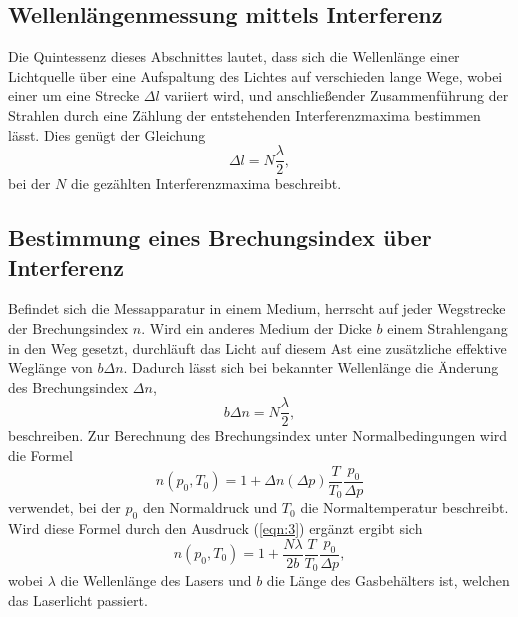 \subsection{Wellenlängenmessung mittels Interferenz}

Die Quintessenz dieses Abschnittes lautet, dass sich die Wellenlänge einer Lichtquelle über eine Aufspaltung des Lichtes auf verschieden lange Wege, wobei einer um eine Strecke $\Delta l$ variiert wird, und anschließender Zusammenführung der Strahlen durch eine Zählung der entstehenden Interferenzmaxima bestimmen lässt.
Dies genügt der Gleichung
\begin{equation}
  \Delta l = N\frac{\lambda}{2}, \label{eqn:2}
\end{equation}
bei der $N$ die gezählten Interferenzmaxima beschreibt.\\

\subsection{Bestimmung eines Brechungsindex über Interferenz}

Befindet sich die Messapparatur in einem Medium, herrscht auf jeder Wegstrecke der Brechungsindex $n$.
Wird ein anderes Medium der Dicke $b$ einem Strahlengang in den Weg gesetzt, durchläuft das Licht auf diesem Ast eine zusätzliche effektive Weglänge von $b\Delta n$.
Dadurch lässt sich bei bekannter Wellenlänge die Änderung des Brechungsindex $\Delta n$,
\begin{equation}
  b\Delta n = N\frac{\lambda}{2}, \label{eqn:3}
\end{equation}
beschreiben.
Zur Berechnung des Brechungsindex unter Normalbedingungen wird die Formel
\begin{equation}
  n(p_0,T_0) = 1 +\Delta n(\Delta p) \frac{T}{T_0}\frac{p_0}{\Delta p}
\end{equation}
verwendet, bei der $p_0$ den Normaldruck und $T_0$ die Normaltemperatur beschreibt.
Wird diese Formel durch den Ausdruck (\ref{eqn:3}) ergänzt ergibt sich
\begin{equation}
  n(p_0,T_0) = 1 +\frac{N \lambda}{2b} \frac{T}{T_0}\frac{p_0}{\Delta p}, \label{eqn:soso}
\end{equation}
wobei $\lambda$ die Wellenlänge des Lasers und $b$ die Länge des Gasbehälters ist, welchen das Laserlicht passiert.





